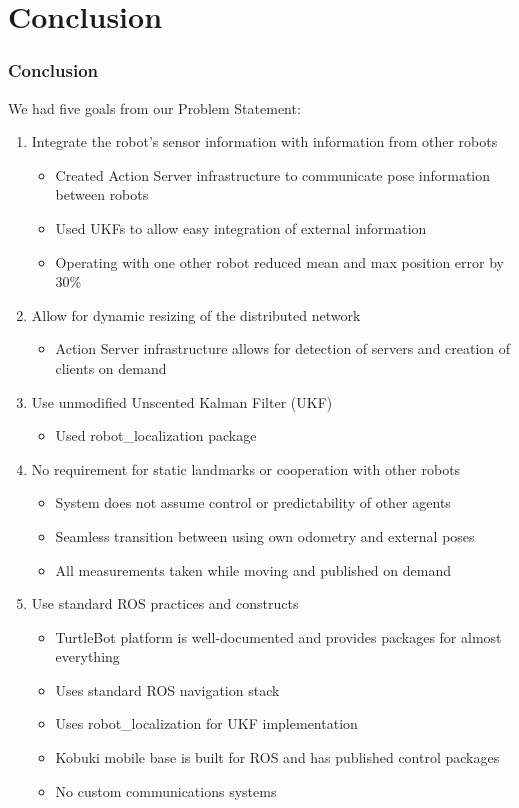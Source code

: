 \documentclass[14pt]{beamer}
\begin{document}
\section{Conclusion}

\begin{frame}[allowframebreaks]
\frametitle{Conclusion}
We had five goals from our Problem Statement:

\vspace{14pt}
\begin{enumerate}
\item Integrate the robot's sensor information with information from other robots
\begin{itemize}
\item Created Action Server infrastructure to communicate pose information between robots
\item Used UKFs to allow easy integration of external information
\item Operating with one other robot reduced mean and max position error by 30\%
\end{itemize}
\framebreak
\vspace*{14pt}
\item Allow for dynamic resizing of the distributed network
    \begin{itemize}
    \item Action Server infrastructure allows for detection of servers and creation of clients on demand
    \end{itemize}
\vspace{14pt}
\item Use unmodified Unscented Kalman Filter (UKF)
    \begin{itemize}
    \item Used robot\_localization package
    \end{itemize}
\framebreak
\item No requirement for static landmarks or cooperation with other robots
    \begin{itemize}
    \item System does not assume control or predictability of other agents
    \item Seamless transition between using own odometry and external poses
    \item All measurements taken while moving and published on demand
    \end{itemize}
\framebreak
\item Use standard ROS practices and constructs
    \begin{itemize}
    \item TurtleBot platform is well-documented and provides packages for almost everything
    \item Uses standard ROS navigation stack
    \item Uses robot\_localization for UKF implementation
    \item Kobuki mobile base is built for ROS and has published control packages
    \item No custom communications systems
    \end{itemize}
\end{enumerate}
\end{frame}
\end{document}
